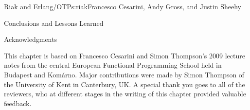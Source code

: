 \begin{aosachapter}{Riak and Erlang/OTP}{s:riak}{Francesco Cesarini, Andy Gross, and Justin Sheehy}
\begin{aosasect1}{Conclusions and Lessons Learned}
\begin{aosasect2}{Acknowledgments}

This chapter is based on Francesco Cesarini and Simon Thompson's 2009
lecture notes from the central European Functional Programming School
held in Budapest and Kom\'{a}rno. Major contributions were made by
Simon Thompson of the University of Kent in Canterbury, UK. A special
thank you goes to all of the reviewers, who at different stages in the
writing of this chapter provided valuable feedback.

\end{aosasect2}

\end{aosasect1}

\end{aosachapter}

